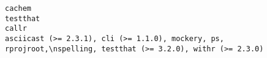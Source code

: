 \documentclass[
  letterpaper,
  DIV=11,
  numbers=noendperiod]{scrreprt}
\begin{document}
\begin{verbatim}
cachem                                                                                                                                                                                                                                                                                                                                                                                                                                                                                                                                                                                                                                                                                                                                                                                                                                                                                                                                                                                                                                                                                                                                                                                                                                                                                               testthat
callr                                                                                                                                                                                                                                                                                                                                                                                                                                                                                                                                                                                                                                                                                                                                                                                                                                                                                                                                                                                                                                                                                                                                                                                          asciicast (>= 2.3.1), cli (>= 1.1.0), mockery, ps, rprojroot,\nspelling, testthat (>= 3.2.0), withr (>= 2.3.0)

\end{verbatim}
\end{document}
